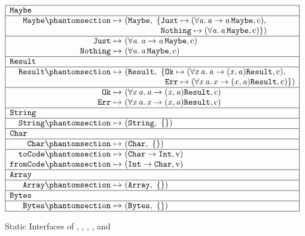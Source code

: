 \begin{figure}[htbp]
\centering
\small
\[
\begin{array}{|r@{\ }c@{\ }l|}
\hline
\multicolumn{3}{|l|}{\kw{Maybe}}\\
\hline
\kw{Maybe}\citelabel{b:Maybe.Maybe} & \mapsto & (\tMaybe,\ \{\kw{Just} \mapsto (\forall\mv{a}.\,\mv{a} \rightarrow \mv{a}\,\tMaybe, \isc),\\
 & & \phantom{(\tMaybe,\ \{}\kw{Nothing} \mapsto (\forall\mv{a}.\,\mv{a}\,\tMaybe, \isc)\})\\
\hline
\kw{Just}\citealso{b:Maybe.Maybe} & \mapsto & (\forall\mv{a}.\,\mv{a} \rightarrow \mv{a}\,\tMaybe, \isc)\\
\kw{Nothing}\citealso{b:Maybe.Maybe} & \mapsto & (\forall\mv{a}.\,\mv{a}\,\tMaybe, \isc)\\
\hline
\multicolumn{3}{|l|}{\kw{Result}}\\
\hline
\kw{Result}\citelabel{b:Result.Result} & \mapsto & (\sbtResult,\ \{\kw{Ok} \mapsto (\forall\mv{x}\,\mv{a}.\,\mv{a} \rightarrow (\mv{x}, \mv{a})\sbtResult, \isc),\\
 & & \phantom{(\sbtResult,\ \{}\kw{Err} \mapsto (\forall\mv{x}\,\mv{a}.\,\mv{x} \rightarrow (\mv{x}, \mv{a})\sbtResult, \isc)\})\\
\hline
\kw{Ok}\citealso{b:Result.Result} & \mapsto & (\forall\mv{x}\,\mv{a}.\,\mv{a} \rightarrow (\mv{x}, \mv{a})\sbtResult, \isc)\\
\kw{Err}\citealso{b:Result.Result} & \mapsto & (\forall\mv{x}\,\mv{a}.\,\mv{x} \rightarrow (\mv{x}, \mv{a})\sbtResult, \isc)\\
\hline
\multicolumn{3}{|l|}{\kw{String}}\\
\hline
\kw{String}\citelabel{b:String.String} & \mapsto & (\tString,\ \emptymap)\\
\hline
\multicolumn{3}{|l|}{\kw{Char}}\\
\hline
\kw{Char}\citelabel{b:Char.Char} & \mapsto & (\tChar,\ \emptymap)\\
\hline
\kw{toCode}\citelabel{b:Char.toCode} & \mapsto & (\tChar \rightarrow \tInt, \isv)\\
\kw{fromCode}\citelabel{b:Char.fromCode} & \mapsto & (\tInt \rightarrow \tChar, \isv)\\
\hline
\multicolumn{3}{|l|}{\kw{Array}}\\
\hline
\kw{Array}\citelabel{b:Array.Array} & \mapsto & (\tArray,\ \emptymap)\\
\hline
\multicolumn{3}{|l|}{\kw{Bytes}}\\
\hline
\kw{Bytes}\citelabel{b:Bytes.Bytes} & \mapsto & (\tBytes,\ \emptymap)\\
\hline
\end{array}
\]
\caption{Static Interfaces of , , ,
,  and }\label{fig:static-basis-data}
\end{figure}

